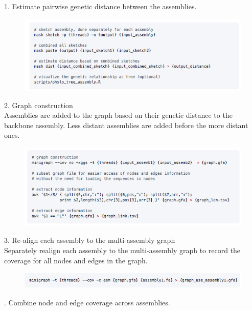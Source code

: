 \documentclass[../main.tex]{subfiles}
\begin{document}
\begin{flushleft}
1. Estimate pairwise genetic distance between the assemblies. \\
    \vspace{3mm}
    \begin{figure}[!htb]
        \centering
        \includegraphics[width=\textwidth]{paper3/supplement/sp421.png}
    \end{figure}
2. Graph construction \\ Assemblies are added to the graph based on their genetic distance to the backbone assembly. Less distant assemblies are added before the more distant ones. \\
    \vspace{3mm}
    \begin{figure}[!htb]
        \centering
        \includegraphics[width=\textwidth]{paper3/supplement/sp422.png}
    \end{figure}
3. Re-align each assembly to the multi-assembly graph \\ Separately realign each assembly to the multi-assembly graph to record the coverage for all nodes and edges in the graph. \\ 
    \vspace{3mm}
    \begin{figure}[!htb]
        \centering
        \includegraphics[width=\textwidth]{paper3/supplement/sp423.png}
    \end{figure}
    . Combine node and edge coverage across assemblies. \\

\end{flushleft}
\end{document}
